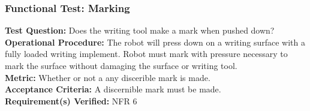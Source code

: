 \subsubsection{Functional Test: Marking}
\label{test:writing_ft_mark}
\textbf{Test Question:} Does the writing tool make a mark when pushed down? \\
\textbf{Operational Procedure:} The robot will press down on a writing surface with a fully loaded writing implement. Robot must mark with pressure necessary to mark the surface without damaging the surface or writing tool.\\
\textbf{Metric:} Whether or not a any discerible mark is made. \\
\textbf{Acceptance Criteria:} A discernible mark must be made.\\
\textbf{Requirement(s) Verified:} NFR 6
